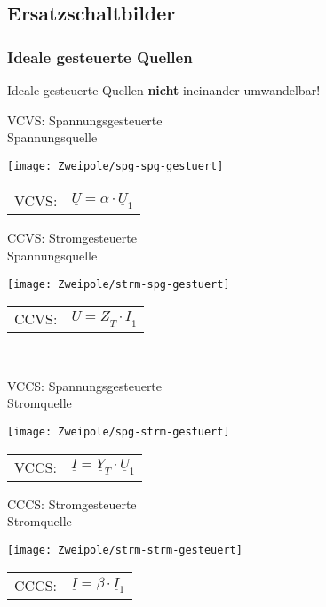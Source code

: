 \subsection{Ersatzschaltbilder}
\subsubsection{Ideale gesteuerte Quellen}
Ideale gesteuerte Quellen \textbf{nicht} ineinander umwandelbar!\\
\begin{minipage}[t]{0.5\columnwidth}
\footnotesize
VCVS: Spannungsgesteuerte\\ Spannungsquelle
\normalsize
\begin{center}
	\texttt{[image: Zweipole/spg-spg-gestuert]}\\
	\begin{tabular}{cc}
		VCVS:& $\underline{U}=\alpha\cdot \underline{U}_1$
	\end{tabular}
\end{center}
\end{minipage}
\vspace{1em}
\begin{minipage}[t]{0.5\columnwidth}
 \footnotesize
	CCVS: Stromgesteuerte \\ Spannungsquelle
	\normalsize
	\vspace{-0.4em}
	\begin{center}
		\texttt{[image: Zweipole/strm-spg-gestuert]}\\
		\begin{tabular}{cc}
				CCVS: & $\underline{U}=\underline{Z}_T\cdot \underline{I}_1$
		\end{tabular}
	\end{center}
\end{minipage}
\\
\begin{minipage}[t]{0.5\columnwidth}
	\footnotesize
	VCCS: Spannungsgesteuerte\\ Stromquelle
	\normalsize
	\begin{center}
		\texttt{[image: Zweipole/spg-strm-gestuert]}\\
		\begin{tabular}{cc}
			VCCS:& $\underline{I}=\underline{Y}_T\cdot \underline{U}_1$
		\end{tabular}
	\end{center}
\end{minipage}
\begin{minipage}[t]{0.5\columnwidth}
	\footnotesize
	CCCS: Stromgesteuerte\\ Stromquelle
	\normalsize
	\begin{center}
		\texttt{[image: Zweipole/strm-strm-gesteuert]}\\
		\begin{tabular}{cc}
			CCCS:& $\underline{I}=\beta\cdot \underline{I}_1$
		\end{tabular}
	\end{center}
\end{minipage}
 \vspace{1em}

